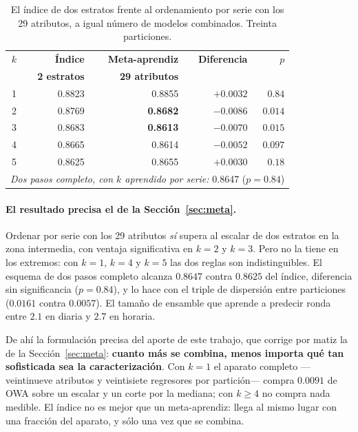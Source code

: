 \begin{table}[htbp]
\centering
\caption{El índice de dos estratos frente al ordenamiento por serie con los 29
atributos, a igual número de modelos combinados. Treinta particiones.}
\label{tab:dospasos}
\begin{tabular}{crrrr}
\toprule
$k$ & \textbf{Índice} & \textbf{Meta-aprendiz} & \textbf{Diferencia} & \textbf{$p$} \\
  & \textbf{2 estratos} & \textbf{29 atributos} & & \\
\midrule
1 & 0.8823 & 0.8855 & $+0.0032$ & $0.84$ \\
2 & 0.8769 & \textbf{0.8682} & $-0.0086$ & $0.014$ \\
3 & 0.8683 & \textbf{0.8613} & $-0.0070$ & $0.015$ \\
4 & 0.8665 & 0.8614 & $-0.0052$ & $0.097$ \\
5 & 0.8625 & 0.8655 & $+0.0030$ & $0.18$ \\
\midrule
\multicolumn{5}{l}{\emph{Dos pasos completo, con $k$ aprendido por serie:}
  0.8647 \quad ($p=0.84$)} \\
\bottomrule
\end{tabular}
\end{table}

\paragraph{El resultado precisa el de la Sección~\ref{sec:meta}.} Ordenar por serie con
los 29 atributos \emph{sí} supera al escalar de dos estratos en la zona intermedia, con
ventaja significativa en $k=2$ y $k=3$. Pero no la tiene en los extremos: con $k=1$,
$k=4$ y $k=5$ las dos reglas son indistinguibles. El esquema de dos pasos completo
alcanza $0.8647$ contra $0.8625$ del índice, diferencia sin significancia ($p=0.84$), y
lo hace con el triple de dispersión entre particiones ($0.0161$ contra $0.0057$). El tamaño de ensamble que aprende a predecir ronda entre
$2.1$ en diaria y $2.7$ en horaria.

De ahí la formulación precisa del aporte de este trabajo, que corrige por matiz la de
la Sección~\ref{sec:meta}: \textbf{cuanto más se combina, menos importa qué tan
sofisticada sea la caracterización}. Con $k=1$ el aparato completo ---veintinueve
atributos y veintisiete regresores por partición--- compra $0.0091$ de OWA sobre un
escalar y un corte por la mediana; con $k\ge4$ no compra nada medible. El índice no es
mejor que un meta-aprendiz: llega al mismo lugar con una fracción del aparato, y sólo
una vez que se combina.

